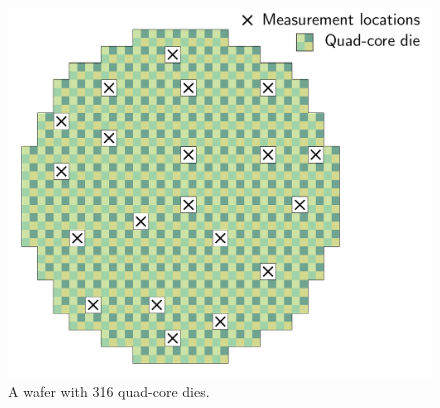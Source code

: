 \begin{figure}
  \centering
  \includegraphics[width=0.7\linewidth]{include/figures/wafer-pick.pdf}
  \caption{A wafer with 316 quad-core dies.}
  \vspace{-1.5em}
\end{figure}
